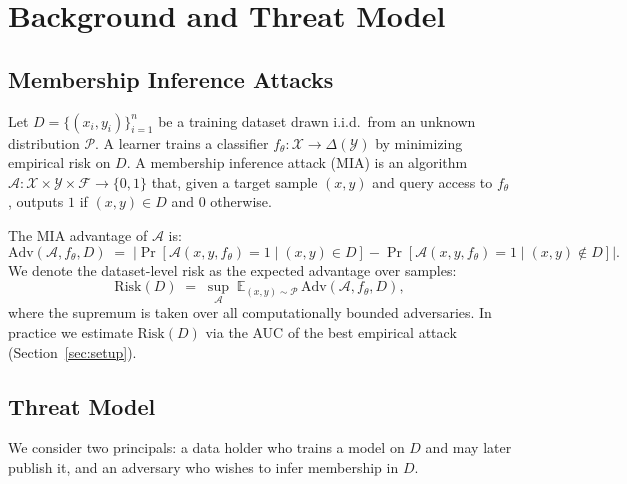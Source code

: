 
\section{Background and Threat Model}
\label{sec:threat}

\subsection{Membership Inference Attacks}

Let $D = \{(x_i, y_i)\}_{i=1}^{n}$ be a training dataset drawn i.i.d.\ from an
unknown distribution $\mathcal{P}$.
A learner trains a classifier $f_\theta : \mathcal{X} \to \Delta(\mathcal{Y})$
by minimizing empirical risk on $D$.
A membership inference attack (MIA) is an algorithm
$\mathcal{A} : \mathcal{X} \times \mathcal{Y} \times \mathcal{F} \to \{0,1\}$
that, given a target sample $(x, y)$ and query access to $f_\theta$,
outputs $1$ if $(x,y) \in D$ and $0$ otherwise.

The MIA advantage of $\mathcal{A}$ is:
\begin{equation}
  \mathrm{Adv}(\mathcal{A}, f_\theta, D)
  \;=\;
  \left|
    \Pr[\mathcal{A}(x,y,f_\theta)=1 \mid (x,y)\in D]
    -
    \Pr[\mathcal{A}(x,y,f_\theta)=1 \mid (x,y)\notin D]
  \right|.
  \label{eq:adv}
\end{equation}
We denote the dataset-level risk as the expected advantage over samples:
\begin{equation}
  \mathrm{Risk}(D) \;=\; \sup_{\mathcal{A}} \;\mathbb{E}_{(x,y)\sim\mathcal{P}}\,
  \mathrm{Adv}(\mathcal{A}, f_\theta, D),
  \label{eq:risk}
\end{equation}
where the supremum is taken over all computationally bounded adversaries.
In practice we estimate $\mathrm{Risk}(D)$ via the AUC of the best empirical
attack (Section~\ref{sec:setup}).

\subsection{Threat Model}

We consider two principals: a data holder who trains a model on $D$
and may later publish it, and an adversary who wishes to infer
membership in $D$.


